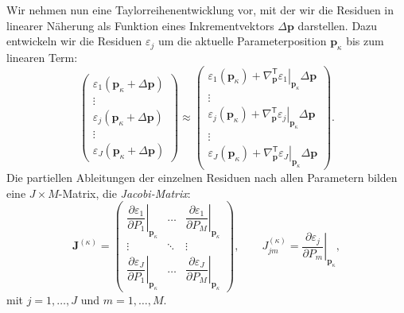 Wir nehmen nun eine Taylorreihenentwicklung vor, mit der wir die Residuen in linearer Näherung
als Funktion eines Inkrementvektors $\Delta \mathbf{p}$ darstellen. Dazu entwickeln wir die
Residuen $\varepsilon_j$ um die aktuelle Parameterposition $\mathbf{p}_\kappa$ bis zum linearen
Term:
\begin{equation}
\left(\begin{array}{c}
\varepsilon_1(\mathbf{p}_\kappa+\Delta\mathbf{p}) \\
\vdots \\
\varepsilon_j(\mathbf{p}_\kappa+\Delta\mathbf{p}) \\
\vdots \\
\varepsilon_J(\mathbf{p}_\kappa+\Delta\mathbf{p})
\end{array}\right)
\approx
\left(\begin{array}{c}
\varepsilon_1(\mathbf{p}_\kappa)
+
\left.
\nabla_{\mathbf{p}}^\mathsf{T} \varepsilon_1
\right|_{\mathbf{p}_\kappa}
\Delta \mathbf{p}
\\
\vdots \\
\varepsilon_j(\mathbf{p}_\kappa)
+
\left.
\nabla_{\mathbf{p}}^\mathsf{T} \varepsilon_j
\right|_{\mathbf{p}_\kappa}
\Delta \mathbf{p}
\\
\vdots \\
\varepsilon_J(\mathbf{p}_\kappa)
+
\left.
\nabla_{\mathbf{p}}^\mathsf{T} \varepsilon_J
\right|_{\mathbf{p}_\kappa}
\Delta \mathbf{p}
\end{array}\right).
\label{TaylorResi1}
\end{equation}
Die partiellen Ableitungen der einzelnen Residuen nach allen Parametern bilden eine
$J\times M$-Matrix, die \textsl{Jacobi-Matrix}:
\begin{equation}
\boldsymbol{J}^{(\kappa)}
=
\left(\begin{array}{ccc}
\left. \dfrac{\partial \varepsilon_1}{\partial P_1} \right|_{\mathbf{p}_\kappa}
&
\dots
&
\left. \dfrac{\partial \varepsilon_1}{\partial P_M} \right|_{\mathbf{p}_\kappa}
\\[2.0ex]
\vdots
&
\ddots
&
\vdots
\\[1.0ex]
\left. \dfrac{\partial \varepsilon_J}{\partial P_1} \right|_{\mathbf{p}_\kappa}
&
\dots
&
\left. \dfrac{\partial \varepsilon_J}{\partial P_M} \right|_{\mathbf{p}_\kappa}
\end{array}\right),
\qquad
J_{jm}^{(\kappa)}
=
\left.
\frac{\partial \varepsilon_j}{\partial P_m}
\right|_{\mathbf{p}_\kappa},
\label{eq:JakobimatrixDefinition}
\end{equation}
mit $j=1,\dots,J$ und $m=1,\dots,M$.

